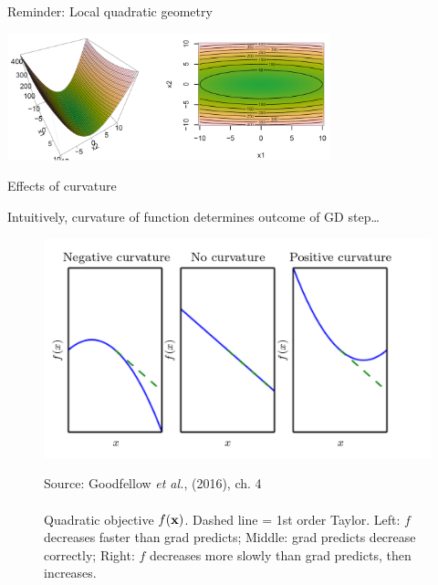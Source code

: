 \documentclass[11pt,compress,t,notes=noshow, xcolor=table]{beamer}
\begin{document}
\begin{vbframe}{Reminder: Local quadratic geometry}
	\begin{center}
		\includegraphics[width=0.7\textwidth]{figure_man/ill-con.png}
	\end{center}

\end{vbframe}


\begin{frame} {Effects of curvature}

	Intuitively, curvature of function determines outcome of GD step\dots
	
	\begin{figure}
		\begin{center}
			\includegraphics[width=.8\textwidth]{figure_man/curvature.png}
		\end{center}
		\tiny{Source: Goodfellow \emph{et al.}, (2016), ch. 4} \\\\
		\footnotesize{Quadratic objective $f(\mathbf{x})$.
			Dashed line = 1st order Taylor. Left: $f$ decreases faster than grad predicts; Middle: grad predicts decrease correctly; Right: $f$ decreases more slowly than grad predicts, then increases. }
	\end{figure}
\end{frame}


	
\end{document}

